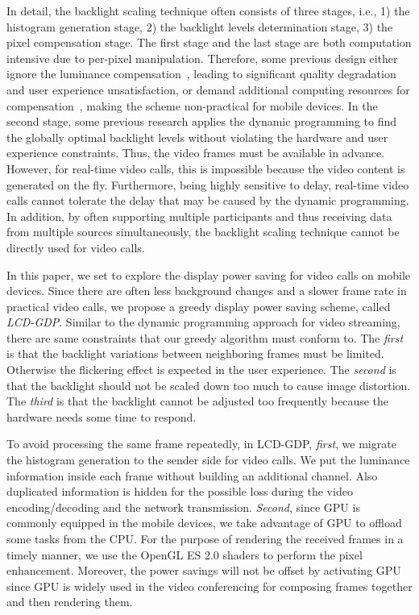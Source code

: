 In detail, the backlight scaling technique often consists of three
stages, i.e., 1) the histogram generation stage, 2) the backlight
levels determination stage, 3) the pixel compensation stage. The first
stage and the last stage are both computation intensive due to
per-pixel manipulation. Therefore, some previous design either ignore
the luminance compensation~\cite{HLH11}, leading to significant
quality degradation and user experience unsatisfaction, or demand
additional computing resources for compensation~\cite{LHH14}, making
the scheme non-practical for mobile devices.  In the second stage,
some previous research applies the dynamic programming to find the
globally optimal backlight levels without violating the hardware and
user experience constraints. Thus, the video frames must be available
in advance.  However, for real-time video calls, this is impossible
because the video content is generated on the fly.  Furthermore, being
highly sensitive to delay, real-time video calls cannot tolerate the
delay that may be caused by the dynamic programming. In addition, by
often supporting multiple participants and thus receiving data from
multiple sources simultaneously, the backlight scaling technique
cannot be directly used for video calls.

In this paper, we set to explore the display power saving for video
calls on mobile devices. Since there are often less background changes
and a slower frame rate in practical video calls, we propose a greedy
display power saving scheme, called {\it LCD-GDP}.  Similar to the
dynamic programming approach for video streaming, there are same
constraints that our greedy algorithm must conform to. The {\it first}
is that the backlight variations between neighboring frames must be
limited. Otherwise the flickering effect is expected in the user
experience. The {\it second} is that the backlight should not be
scaled down too much to cause image distortion.  The {\it third} is
that the backlight cannot be adjusted too frequently because the
hardware needs some time to respond.

To avoid processing the same frame repeatedly, in LCD-GDP, {\it
  first}, we migrate the histogram generation to the sender side for
video calls. We put the luminance information inside each frame
without building an additional channel. Also duplicated information is
hidden for the possible loss during the video encoding/decoding and
the network transmission. {\it Second}, since GPU is commonly equipped
in the mobile devices, we take advantage of GPU to offload some tasks
from the CPU. For the purpose of rendering the received frames in a
timely manner, we use the OpenGL ES 2.0 shaders to perform the pixel
enhancement.  Moreover, the power savings will not be offset by
activating GPU since GPU is widely used in the video conferencing for
composing frames together and then rendering them.

